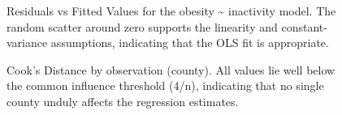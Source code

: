 \documentclass[
  letterpaper,
  DIV=11,
  numbers=noendperiod]{scrartcl}
\begin{document}
\begin{figure}[H]


\caption{\label{fig-residuals}Residuals vs Fitted Values for the obesity
\textasciitilde{} inactivity model. The random scatter around zero
supports the linearity and constant-variance assumptions, indicating
that the OLS fit is appropriate.}

\end{figure}%

\begin{figure}[H]


\caption{\label{fig-cooks}Cook's Distance by observation (county). All
values lie well below the common influence threshold (4/n), indicating
that no single county unduly affects the regression estimates.}

\end{figure}%
\end{document}
